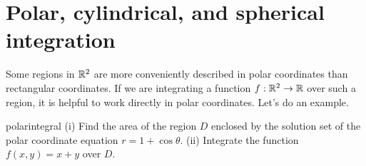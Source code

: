 \documentclass[prettycode,shellescape]{watsonbook}
\begin{document}
\newpage 

\section{Polar, cylindrical, and spherical integration} \label{sec:polar_int}

Some regions in $\mathbb{R}^2$ are more conveniently described in polar
coordinates than rectangular coordinates. If we are integrating a
function $f: \mathbb{R}^2 \to \mathbb{R}$ over such a region, it is helpful to work
directly in polar coordinates. Let's do an example.

\begin{example}{}{polarintegral}
  (i) Find the area of the region $D$ enclosed by the solution set of
  the polar coordinate equation $r = 1 + \cos \theta$. (ii) Integrate
  the function $f(x,y) = x + y$ over $D$.
\end{example}
\end{document}

